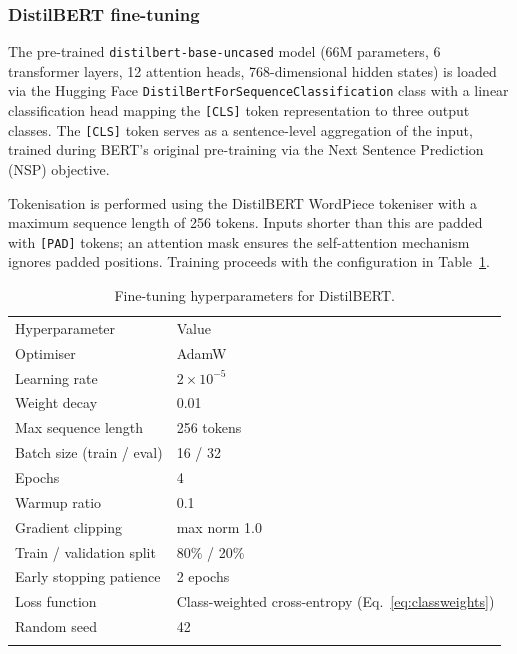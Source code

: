 \documentclass[3p,times,procedia]{elsarticle}
\begin{document}
\subsubsection{DistilBERT fine-tuning}

The pre-trained \texttt{distilbert-base-uncased} model (66M parameters, 6 transformer layers, 12 attention heads, 768-dimensional hidden states) is loaded via the Hugging Face \texttt{DistilBertForSequenceClassification} class with a linear classification head mapping the \texttt{[CLS]} token representation to three output classes. The \texttt{[CLS]} token serves as a sentence-level aggregation of the input, trained during BERT's original pre-training via the Next Sentence Prediction (NSP) objective.

Tokenisation is performed using the DistilBERT WordPiece tokeniser with a maximum sequence length of 256 tokens. Inputs shorter than this are padded with \texttt{[PAD]} tokens; an attention mask ensures the self-attention mechanism ignores padded positions. Training proceeds with the configuration in Table~\ref{tab:hyperparams}.

\begin{table}[h]
\caption{Fine-tuning hyperparameters for DistilBERT.}
\label{tab:hyperparams}
\begin{tabular*}{\hsize}{@{\extracolsep{\fill}}ll@{}}
\toprule
Hyperparameter & Value \\
\colrule
Optimiser & AdamW~\cite{loshchilov2019} \\
Learning rate & $2 \times 10^{-5}$ \\
Weight decay & 0.01 \\
Max sequence length & 256 tokens \\
Batch size (train / eval) & 16 / 32 \\
Epochs & 4 \\
Warmup ratio & 0.1 \\
Gradient clipping & max norm 1.0 \\
Train / validation split & 80\% / 20\% \\
Early stopping patience & 2 epochs \\
Loss function & Class-weighted cross-entropy (Eq.~\ref{eq:classweights}) \\
Random seed & 42 \\
\botrule
\end{tabular*}
\end{table}
\end{document}
